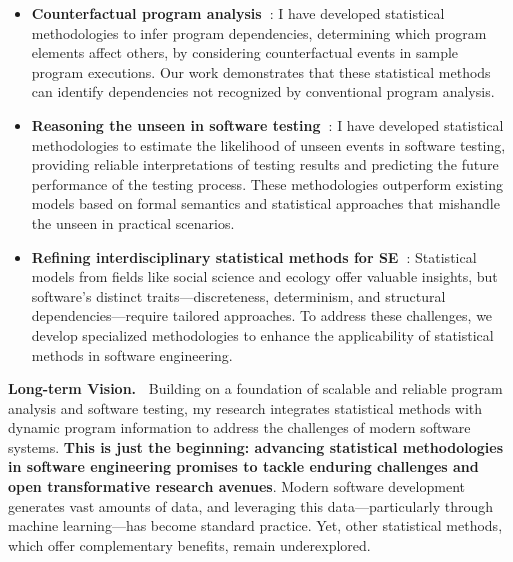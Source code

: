\documentclass{article}
\begin{document}
\begin{itemize}[leftmargin=*,parsep=1pt]
  \item \textbf{Counterfactual program analysis~\cite[Section~\ref{sec:dependency}]{leeObservationbasedApproximateDependency2021,leeCausalProgramDependence2025a,leeEvaluatingLexicalApproximation2020,ohEffectivelySamplingHigher2021}}:
        I have developed statistical methodologies to infer program dependencies, determining which program elements affect others, by considering counterfactual events in sample program executions. Our work demonstrates that these statistical methods can identify dependencies not recognized by conventional program analysis.
  \item \textbf{Reasoning the unseen in software testing~\cite[Section~\ref{sec:unseen}]{leeStatisticalReachabilityAnalysis2023,leeStructureawareResidualRisk2025,leeAccountingMissingEvents2025,liyanageExtrapolatingCoverageRate2024}}:
        I have developed statistical methodologies to estimate the likelihood of unseen events in software testing, providing reliable interpretations of testing results and predicting the future performance of the testing process. These methodologies outperform existing models based on formal semantics and statistical approaches that mishandle the unseen in practical scenarios.
  \item \textbf{Refining interdisciplinary statistical methods for SE~\cite[Section~\ref{sec:refine}]{leeCausalProgramDependence2025a,leeStatisticalReachabilityAnalysis2023,leeHowMuchUnseen2024,leeStructureawareResidualRisk2025}}: 
        Statistical models from fields like social science and ecology offer valuable insights, but software’s distinct traits—discreteness, determinism, and structural dependencies—require tailored approaches. To address these challenges, we develop specialized methodologies to enhance the applicability of statistical methods in software engineering.
\end{itemize}

\noindent\textbf{Long-term Vision.~}
Building on a foundation of scalable and reliable program analysis and software testing, my research integrates statistical methods with dynamic program information to address the challenges of modern software systems. \textbf{This is just the beginning: advancing statistical methodologies in software engineering promises to tackle enduring challenges and open transformative research avenues}.
% 
Modern software development generates vast amounts of data, and leveraging this data—particularly through machine learning—has become standard practice. Yet, other statistical methods, which offer complementary benefits, remain underexplored. 
\end{document}
